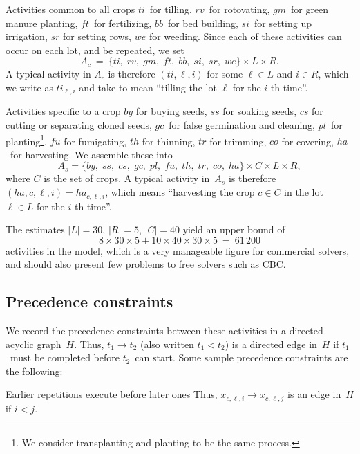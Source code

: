 \documentclass[11pt,reqno]{amsart}
\newcommand{\lra}{\longrightarrow}
\numberwithin{equation}{section}
\begin{document}
\begin{mydesc}
\item[Activities common to all crops]  $ti$~for tilling, $rv$~for
  rotovating, $gm$~for green manure planting, $f\!t$~for fertilizing,
  $bb$~for bed building, $si$~for setting up irrigation, $sr$ for
  setting rows, $we$ for weeding. Since each of these activities can
  occur on each lot, and be repeated, we set
  \[
     A_c 
     \ = \
     \{ ti,\;rv,\;gm,\;f\!t,\;bb,\;si,\;sr,\;we\} \times L \times R.
  \]
  A typical activity in $A_c$ is therefore $(ti,\ell, i)$ for some
  $\ell\in L$ and $i\in R$, which we write as $ti_{\ell, i}$ and take
  to mean ``tilling the lot $\ell$ for the $i$-th time''.


\item[Activities specific to a crop] $by$ for buying seeds, $ss$ for
  soaking seeds, $cs$ for cutting or separating cloned seeds, $gc$~for
  false germination and cleaning, $pl$~for planting\footnote{We
    consider transplanting and planting to be the same process.},
  $f\!u$ for fumigating, $th$ for thinning, $tr$ for trimming, $co$
  for covering, $ha$~for harvesting. We assemble these into
  \[
     A_s = \{ by,\;ss,\;cs,\;gc,\;pl,\;f\!u,\;th,\;tr,\;co,\;ha\}
     \times C \times L \times R,
  \]
  where $C$ is the set of crops. A typical activity in~$A_s$ is therefore
  $(ha,c,\ell, i)=ha_{c,\ell, i}$, which means ``harvesting the crop $c\in
  C$ in the lot $\ell\in L$ for the $i$-th time''.
\end{mydesc}

The estimates $|L|=30$, $|R|=5$, $|C|=40$ yield an upper bound of
\[
    8 \times 30 \times 5 + 10 \times 40 \times 30 \times 5
    \ = \
    61\,200
\]
activities in the model, which is a very manageable figure for
commercial solvers, and should also present few problems to free
solvers such as CBC.


\subsection{Precedence constraints}

We record the precedence constraints between these activities in a directed acyclic
graph~$H$. Thus, $t_1\lra t_2$ (also written $t_1<t_2$) is a directed edge
in~$H$ if $t_1$~must be completed before $t_2$~can start. Some sample precedence
constraints are the following:

\begin{mydesc}
\item[Earlier repetitions execute before later ones] Thus, $x_{c,\ell,i}\lra
  x_{c,\ell,j}$ is an edge in~$H$ if $i<j$.
\end{mydesc}
\end{document}

